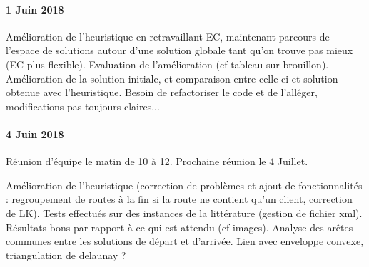 \documentclass[a4paper,11pt]{article}%
\begin{document}
\paragraph*{1 Juin 2018}

Amélioration de l'heuristique en retravaillant EC, maintenant parcours de l'espace de solutions autour d'une solution globale tant qu'on trouve pas mieux (EC plus flexible). Evaluation de l'amélioration (cf tableau sur brouillon). Amélioration de la solution initiale, et comparaison entre celle-ci et solution obtenue avec l'heuristique. Besoin de refactoriser le code et de l'alléger, modifications pas toujours claires...

\paragraph*{4 Juin 2018}
Réunion d'équipe le matin de 10 à 12. Prochaine réunion le 4 Juillet.

Amélioration de l'heuristique (correction de problèmes et ajout de fonctionnalités : regroupement de routes à la fin si la route ne contient qu'un client, correction de LK). 
Tests effectués sur des instances de la littérature (gestion de fichier xml). Résultats bons par rapport à ce qui est attendu (cf images). Analyse des arêtes communes entre les solutions de départ et d'arrivée. Lien avec enveloppe convexe, triangulation de delaunay ? 
\end{document}
